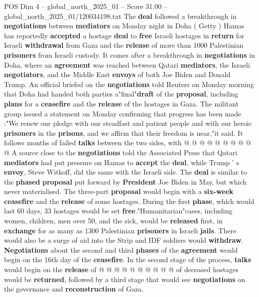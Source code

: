 \begin{textsample}{POS Dim 4 – global\_north\_2025\_01 – Score 31.00 – global\_north\_2025\_01/120034198.txt}  \label{ex:f4_pos_046}
The \textbf{deal} followed a breakthrough in \textbf{negotiations} between \textbf{mediators} on Monday night in Doha ( Getty ) Hamas has reportedly \textbf{accepted} a hostage \textbf{deal} to \textbf{free} Israeli hostages in \textbf{return} for Israeli \textbf{withdrawal} from Gaza and the \textbf{release} of more than 1000 Palestinian \textbf{prisoners} from Israeli custody.
It comes after a breakthrough in \textbf{negotiations} in Doha, where an \textbf{agreement} was reached between Qatari \textbf{mediators}, the Israeli \textbf{negotiators}, and the Middle East \textbf{envoys} of both Joe Biden and Donald Trump.
An official briefed on the \textbf{negotiations} told Reuters on Monday morning that Doha had handed both parties a"final"\textbf{draft} of the \textbf{proposal}, including \textbf{plans} for a \textbf{ceasefire} and the \textbf{release} of the hostages in Gaza.
The militant group issued a statement on Monday confirming that progress has been made :"We renew our pledge with our steadfast and patient people and with our heroic \textbf{prisoners} in the \textbf{prisons}, and we affirm that their freedom is near,"it said.
It follows months of failed \textbf{talks} between the two sides, with @ @ @ @ @ @ @ @ @ @ A source close to the \textbf{negotiations} told the Associated Press that Qatari \textbf{mediators} had put pressure on Hamas to \textbf{accept} the \textbf{deal}, while Trump ' s \textbf{envoy}, Steve Witkoff, did the same with the Israeli side.
The \textbf{deal} is similar to the \textbf{phased} \textbf{proposal} put forward by \textbf{President} Joe Biden in May, but which never materialised.
The three-part \textbf{proposal} would begin with a \textbf{six-week} \textbf{ceasefire} and the \textbf{release} of some hostages.
During the first \textbf{phase}, which would last 60 days, 33 hostages would be set \textbf{free}."Humanitarian"cases, including women, children, men over 50, and the sick, would be \textbf{released} first, in \textbf{exchange} for as many as 1300 Palestinian \textbf{prisoners} in Israeli \textbf{jails}.
There would also be a surge of aid into the Strip and IDF soldiers would \textbf{withdraw}. \textbf{Negotiations} about the second and third \textbf{phases} of the \textbf{agreement} would begin on the 16th day of the \textbf{ceasefire}.
In the second stage of the process, \textbf{talks} would begin on the \textbf{release} of @ @ @ @ @ @ @ @ @ @ of deceased hostages would be \textbf{returned}, followed by a third stage that would see \textbf{negotiations} on the governance and \textbf{reconstruction} of Gaza.

\end{textsample}
